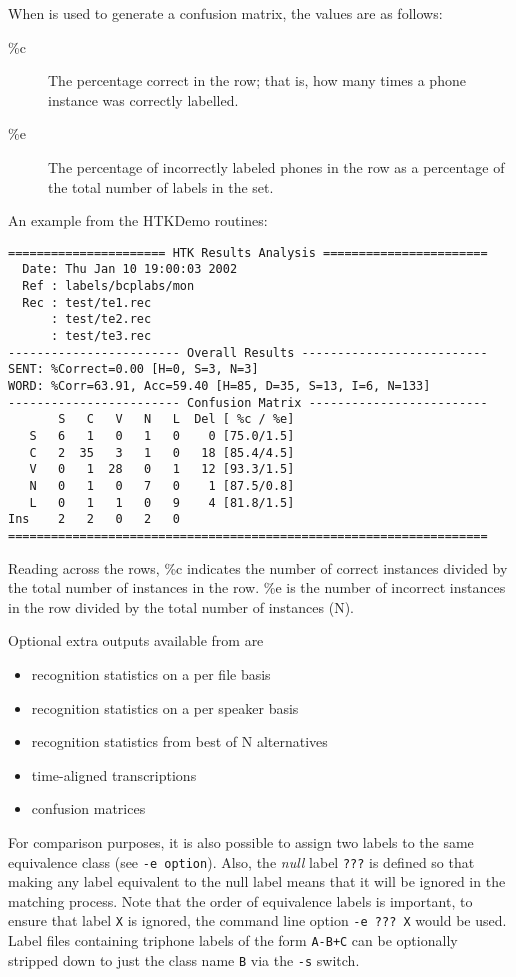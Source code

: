 When  is used to generate a confusion matrix, the
values are as follows:
\begin{description}
\item[\%c] The percentage correct in the row; that is, how many times a phone
     instance was correctly labelled.
\item[\%e] The percentage of incorrectly labeled phones in the row as
     a percentage of the total number of labels in the set.
\end{description}
An example from the HTKDemo routines:
\begin{verbatim}
====================== HTK Results Analysis =======================
  Date: Thu Jan 10 19:00:03 2002
  Ref : labels/bcplabs/mon
  Rec : test/te1.rec
      : test/te2.rec
      : test/te3.rec
------------------------ Overall Results --------------------------
SENT: %Correct=0.00 [H=0, S=3, N=3]
WORD: %Corr=63.91, Acc=59.40 [H=85, D=35, S=13, I=6, N=133]
------------------------ Confusion Matrix -------------------------
       S   C   V   N   L  Del [ %c / %e]
   S   6   1   0   1   0    0 [75.0/1.5]
   C   2  35   3   1   0   18 [85.4/4.5]
   V   0   1  28   0   1   12 [93.3/1.5]
   N   0   1   0   7   0    1 [87.5/0.8]
   L   0   1   1   0   9    4 [81.8/1.5]
Ins    2   2   0   2   0
===================================================================
\end{verbatim}
Reading across the rows, \%c indicates the number of correct instances
divided by the total number of instances in the row.  \%e is the
number of incorrect instances in the row divided by the total number
of instances (N).

Optional extra outputs available from  are
\begin{itemize}
 \item   recognition statistics on a per file basis
 \item   recognition statistics on a per speaker basis
 \item   recognition statistics from best of N alternatives
 \item   time-aligned transcriptions
 \item   confusion matrices
\end{itemize}
For comparison purposes, it is also possible to assign two
labels to the same equivalence class (see {\tt -e option}).  
Also, the {\em null} label {\tt ???} is defined so that making any
label equivalent to the null label means that it will be
ignored in the matching process.  Note that the order of equivalence
labels is important, to ensure that label {\tt X} is ignored, the
command line option \verb+-e ??? X+ would be used.
Label files containing triphone labels of the form {\tt A-B+C} can be 
optionally stripped down to just the class name {\tt B} via the {\tt -s} 
switch.

